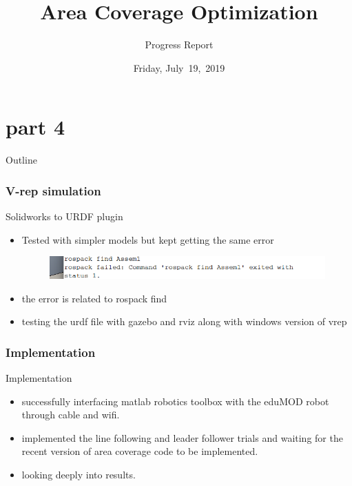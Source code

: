 \documentclass{beamer}
\begin{document}
\part{part 4}
\title{Area Coverage Optimization}
\subtitle{Progress Report}
\date[July~19,~2019]{Friday, July~19,~2019}
\begin{frame}
\maketitle
\end{frame}
\begin{frame}{Outline}
  \tableofcontents
  \end{frame}
\section{V-rep simulation}
\begin{frame}{Solidworks to URDF plugin}
\begin{itemize}
\item Tested with simpler models but kept getting the same error
\begin{figure}
\includegraphics[scale=0.5]{figs/img/error.png}
\end{figure}
\item the error is related to rospack find 
\item testing the urdf file with gazebo and rviz along with windows version of vrep
\end{itemize}
\end{frame}
\section{Implementation}
\begin{frame}{Implementation}
\begin{itemize}
\item successfully interfacing matlab robotics toolbox with the eduMOD robot through cable and wifi.
\item implemented the line following and leader follower trials and waiting for the recent version of area coverage code to be implemented. 
\item looking deeply into results.



\end{itemize}
\end{frame}
\end{document}
